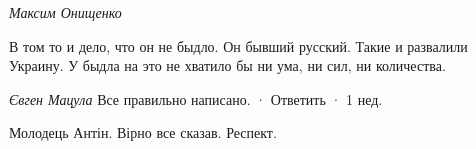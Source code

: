 \begin{itemize}
\begin{itemize}
\emph{Максим Онищенко}

В том то и дело, что он не быдло. Он бывший русский. Такие и развалили Украину.
У быдла на это не хватило бы ни ума, ни сил, ни количества.

\end{itemize}

\emph{Євген Мацула}
Все правильно написано.
 · Ответить · 1 нед.
 
Молодець Антін. Вірно все сказав. Респект.



\end{itemize}

